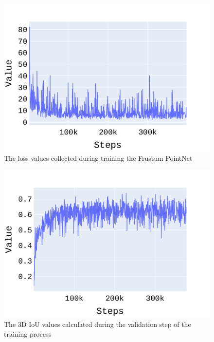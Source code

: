 \documentclass[10pt,twocolumn,letterpaper]{article}
\begin{document}
\begin{figure}[!htbp]
	\centering
	\includegraphics[scale = 0.4]{./images/LYFT_Detections/total_loss_1.pdf}
	\caption{The loss values collected during training the Frustum PointNet}
	\label{fig:Loss_F-PointNet}
\end{figure}  

\begin{figure}[!htbp]
	\centering
	\includegraphics[scale = 0.4]{./images/LYFT_Detections/iou_3d.pdf}
	\caption{The 3D IoU values calculated during the validation step of the training process}
	\label{fig:IoU_F-PointNet}
\end{figure}
 
\end{document}
